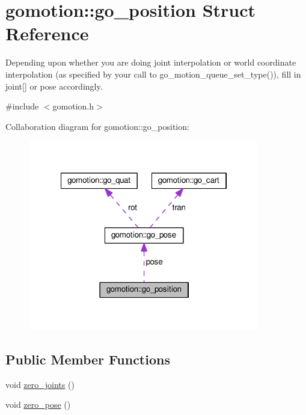 \hypertarget{structgomotion_1_1go__position}{\section{gomotion\-:\-:go\-\_\-position Struct Reference}
\label{structgomotion_1_1go__position}
}


Depending upon whether you are doing joint interpolation or world coordinate interpolation (as specified by your call to go\-\_\-motion\-\_\-queue\-\_\-set\-\_\-type()), fill in joint\mbox{[}\mbox{]} or pose accordingly.  




{\ttfamily \#include $<$gomotion.\-h$>$}



Collaboration diagram for gomotion\-:\-:go\-\_\-position\-:\nopagebreak
\begin{figure}[H]
\begin{center}
\leavevmode
\includegraphics[width=285pt]{dc/d93/structgomotion_1_1go__position__coll__graph}
\end{center}
\end{figure}
\subsection*{Public Member Functions}
\begin{DoxyCompactItemize}
\item 
void \hyperlink{structgomotion_1_1go__position_af075d5442765600dd50494b47161db4b}{zero\-\_\-joints} ()
\item 
void \hyperlink{structgomotion_1_1go__position_ab319ce59146e5f8313bdb5d1b7001617}{zero\-\_\-pose} ()
\end{DoxyCompactItemize}
